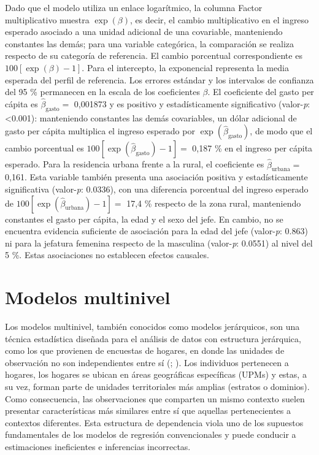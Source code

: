 \documentclass[
  spanish,
  11pt,
  letterpaper,
  oneside,
  open=any]{scrbook}
\begin{document}
Dado que el modelo utiliza un enlace logarítmico, la columna Factor
multiplicativo muestra \(\exp(\beta)\), es decir, el cambio
multiplicativo en el ingreso esperado asociado a una unidad adicional de
una covariable, manteniendo constantes las demás; para una variable
categórica, la comparación se realiza respecto de su categoría de
referencia. El cambio porcentual correspondiente es
\(100[\exp(\beta)-1]\). Para el intercepto, la exponencial representa la
media esperada del perfil de referencia. Los errores estándar y los
intervalos de confianza del 95 \% permanecen en la escala de los
coeficientes \(\beta\). El coeficiente del gasto per cápita es
\(\hat\beta_{\mathrm{gasto}}=\) 0,001873 y es positivo y
estadísticamente significativo (valor-\emph{p}: \textless0.001):
manteniendo constantes las demás covariables, un dólar adicional de
gasto per cápita multiplica el ingreso esperado por
\(\exp(\hat\beta_{\mathrm{gasto}})\), de modo que el cambio porcentual
es \(100[\exp(\hat\beta_{\mathrm{gasto}})-1]=\) 0,187 \% en el ingreso
per cápita esperado. Para la residencia urbana frente a la rural, el
coeficiente es \(\hat\beta_{\mathrm{urbana}}=\) 0,161. Esta variable
también presenta una asociación positiva y estadísticamente
significativa (valor-\emph{p}: 0.0336), con una diferencia porcentual
del ingreso esperado de \(100[\exp(\hat\beta_{\mathrm{urbana}})-1]=\)
17,4 \% respecto de la zona rural, manteniendo constantes el gasto per
cápita, la edad y el sexo del jefe. En cambio, no se encuentra evidencia
suficiente de asociación para la edad del jefe (valor-\emph{p}: 0.863)
ni para la jefatura femenina respecto de la masculina (valor-\emph{p}:
0.0551) al nivel del 5 \%. Estas asociaciones no establecen efectos
causales.


\chapter{Modelos multinivel}\label{cap7}

Los modelos multinivel, también conocidos como modelos jerárquicos, son
una técnica estadística diseñada para el análisis de datos con
estructura jerárquica, como los que provienen de encuestas de hogares,
en donde las unidades de observación no son independientes entre sí
(;
).
Los individuos pertenecen a hogares, los hogares se ubican en áreas
geográficas específicas (UPMs) y estas, a su vez, forman parte de
unidades territoriales más amplias (estratos o dominios). Como
consecuencia, las observaciones que comparten un mismo contexto suelen
presentar características más similares entre sí que aquellas
pertenecientes a contextos diferentes. Esta estructura de dependencia
viola uno de los supuestos fundamentales de los modelos de regresión
convencionales y puede conducir a estimaciones ineficientes e
inferencias incorrectas.
\end{document}
